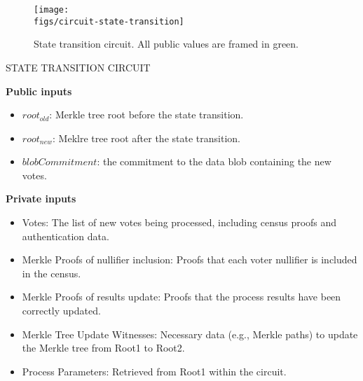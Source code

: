 \begin{figure}[H]
	\centering
\end{figure}

\begin{figure}[H]
	\centering
\end{figure}

\begin{figure}[H]
	\centerline{\texttt{[image: \\figs/circuit-state-transition]}}
	\caption{State transition circuit. All public values are framed in green.}
	\label{fig:circuit-state-transition}
\end{figure}

\begin{mdframed}
	\begin{minipage}[H]{1\textwidth}
		\begin{spacing}{1.25}
			\vspace{0.3cm}
			\begin{center}{STATE TRANSITION CIRCUIT}\end{center}
			\textbf{Public inputs}
			\begin{itemize}
				\item \public $root_{old}$: Merkle tree root before the state transition.
				\item \public $root_{new}$: Meklre tree root after the state transition.
				\item \public $blobCommitment$: the commitment to the data blob containing the new votes.
				\end{itemize}
				\item \textbf{Private inputs}
				\begin{itemize}
				\item \private Votes: The list of new votes being processed, including census proofs and authentication data.
				\item \private Merkle Proofs of nullifier inclusion: Proofs that each voter nullifier is included in the census.
				\item \private Merkle Proofs of results update: Proofs that the process results have been correctly updated.
				\item \private Merkle Tree Update Witnesses: Necessary data (e.g., Merkle paths) to update the Merkle tree from Root1 to Root2.
				\item \private Process Parameters: Retrieved from Root1 within the circuit.

\end{itemize}
\end{spacing}
\end{minipage}
\end{mdframed}
